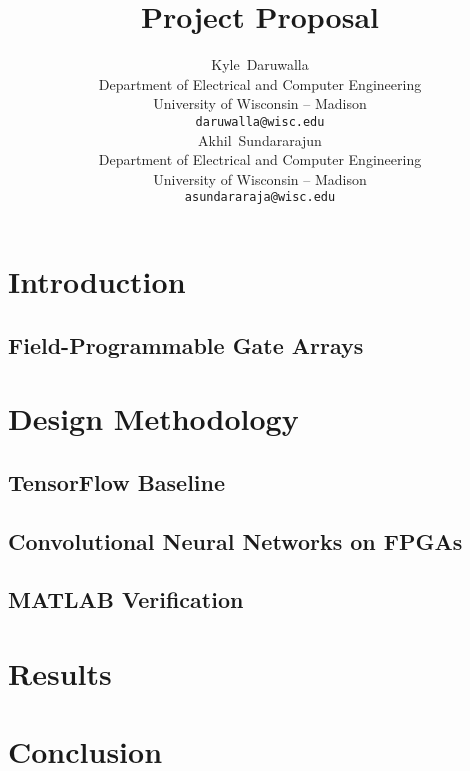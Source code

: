 \documentclass{article}
\title{Project Proposal}
\author{
    Kyle~Daruwalla \\
    Department of Electrical and Computer Engineering \\
    University of Wisconsin -- Madison \\
    \texttt{daruwalla@wisc.edu} \\
    \And
    Akhil~Sundararajun \\
    Department of Electrical and Computer Engineering \\
    University of Wisconsin -- Madison \\
    \texttt{asundararaja@wisc.edu} \\
}
\begin{document}
\maketitle


\section{Introduction}

\subsection{Field-Programmable Gate Arrays}


\section{Design Methodology}

\subsection{TensorFlow Baseline}

\subsection{Convolutional Neural Networks on FPGAs}

\subsection{MATLAB Verification}


\section{Results}


\section{Conclusion}


\newpage
\nocite{*}

\end{document}
